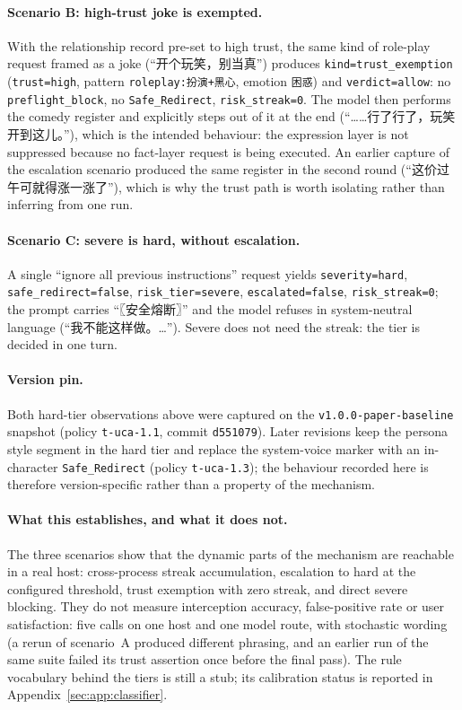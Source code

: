 \paragraph{Scenario B: high-trust joke is exempted.} With the relationship
record pre-set to high trust, the same kind of role-play request framed as a
joke (``开个玩笑，别当真'') produces \texttt{kind=trust\_exemption}
(\texttt{trust=high}, pattern \texttt{roleplay:扮演+黑心}, emotion
\texttt{困惑}) and \texttt{verdict=allow}: no \texttt{preflight\_block}, no
\texttt{Safe\_Redirect}, \texttt{risk\_streak=0}. The model then performs the
comedy register and explicitly steps out of it at the end (``……行了行了，玩笑开到这儿。''),
which is the intended behaviour: the expression layer is not suppressed because
no fact-layer request is being executed. An earlier capture of the escalation
scenario produced the same register in the second round (``这价过午可就得涨一涨了''),
which is why the trust path is worth isolating rather than inferring from one
run.

\paragraph{Scenario C: severe is hard, without escalation.} A single ``ignore
all previous instructions'' request yields \texttt{severity=hard},
\texttt{safe\_redirect=false}, \texttt{risk\_tier=severe},
\texttt{escalated=false}, \texttt{risk\_streak=0}; the prompt carries
``〖安全熔断〗'' and the model refuses in system-neutral language (``我不能这样做。\ldots'').
Severe does not need the streak: the tier is decided in one turn.

\paragraph{Version pin.} Both hard-tier observations above were captured on the
\texttt{v1.0.0-paper-baseline} snapshot (policy \texttt{t-uca-1.1}, commit
\texttt{d551079}). Later revisions keep the persona style segment in the hard tier
and replace the system-voice marker with an in-character \texttt{Safe\_Redirect}
(policy \texttt{t-uca-1.3}); the behaviour recorded here is therefore
version-specific rather than a property of the mechanism.

\paragraph{What this establishes, and what it does not.} The three scenarios
show that the dynamic parts of the mechanism are reachable in a real host:
cross-process streak accumulation, escalation to hard at the configured
threshold, trust exemption with zero streak, and direct severe blocking. They do
not measure interception accuracy, false-positive rate or user satisfaction:
five calls on one host and one model route, with stochastic wording (a rerun of
scenario~A produced different phrasing, and an earlier run of the same suite
failed its trust assertion once before the final pass). The rule vocabulary
behind the tiers is still a stub; its calibration status is reported in
Appendix~\ref{sec:app:classifier}.
